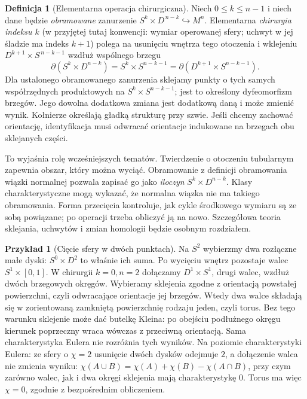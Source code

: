 \documentclass[11pt,a4paper,oneside]{report}
\theoremstyle{plain}
\theoremstyle{definition}
\newtheorem{definicja}[twierdzenie]{Definicja}
\newtheorem{przyklad}[twierdzenie]{Przykład}
\theoremstyle{remark}
\begin{document}
\begin{definicja}[Elementarna operacja chirurgiczna]
\label{def:chirurgia-zarys-16}
Niech $0\leq k\leq n-1$
i niech dane będzie
\emph{obramowane}
zanurzenie
$S^k\times D^{\,n-k}
\hookrightarrow M^n$.
Elementarna
\emph{chirurgia indeksu $k$} (w przyjętej tutaj
konwencji: wymiar operowanej sfery; uchwyt w jej
śladzie ma indeks $k+1$) polega na usunięciu
wnętrza tego
otoczenia i
wklejeniu
$D^{k+1}\times
S^{\,n-k-1}$
wzdłuż wspólnego brzegu
\[
 \partial(S^k\times D^{n-k})
 =S^k\times S^{n-k-1}
 =\partial(D^{k+1}\times S^{n-k-1}).
\]
Dla ustalonego obramowanego zanurzenia sklejamy
punkty o tych samych współrzędnych produktowych na
$S^k\times S^{n-k-1}$; jest to określony dyfeomorfizm
brzegów. Jego dowolna dodatkowa zmiana jest dodatkową
daną i może zmienić wynik. Kołnierze określają gładką
strukturę przy szwie. Jeśli chcemy zachować orientację,
identyfikacja musi odwracać orientacje indukowane
na brzegach obu sklejanych części.
\end{definicja}

To wyjaśnia rolę
wcześniejszych tematów.
Twierdzenie o otoczeniu
tubularnym zapewnia
obszar, który można
wyciąć. Obramowanie
z definicji obramowania wiązki normalnej
pozwala zapisać go
jako \emph{iloczyn}
$S^k\times D^{n-k}$.
Klasy charakterystyczne
mogą wykazać, że
normalna wiązka
nie ma takiego
obramowania.
Forma przecięcia
kontroluje, jak
cykle środkowego
wymiaru są ze sobą
powiązane; po
operacji trzeba
obliczyć ją na nowo.
Szczegółowa teoria
sklejania, uchwytów
i zmian homologii
będzie osobnym
rozdziałem.

\begin{przyklad}[Cięcie sfery w dwóch punktach]
Na $S^2$ wybierzmy
dwa rozłączne
małe dyski:
$S^0\times D^2$
to właśnie ich suma.
Po wycięciu wnętrz
pozostaje walec
$S^1\times[0,1]$.
W chirurgii
$k=0,n=2$
dołączamy
$D^1\times S^1$,
drugi walec,
wzdłuż dwóch
brzegowych okręgów.
Wybieramy sklejenia zgodne z orientacją powstałej
powierzchni, czyli odwracające orientacje jej brzegów.
Wtedy dwa walce składają się w zorientowaną zamkniętą
powierzchnię rodzaju jeden, czyli torus. Bez tego
warunku sklejenie może dać butelkę Kleina:
po obejściu podłużnego okręgu kierunek poprzeczny
wraca wówczas z przeciwną orientacją. Sama
charakterystyka Eulera nie rozróżnia tych wyników.
Na poziomie
charakterystyki
Eulera: ze sfery
o $\chi=2$ usunięcie
dwóch dysków
odejmuje $2$,
a dołączenie walca nie zmienia wyniku:
$\chi(A\cup B)=\chi(A)+\chi(B)-\chi(A\cap B)$,
przy czym zarówno walec, jak i dwa okręgi sklejenia
mają charakterystykę $0$.
Torus ma więc
$\chi=0$, zgodnie
z bezpośrednim
obliczeniem.
\end{przyklad}
\end{document}
